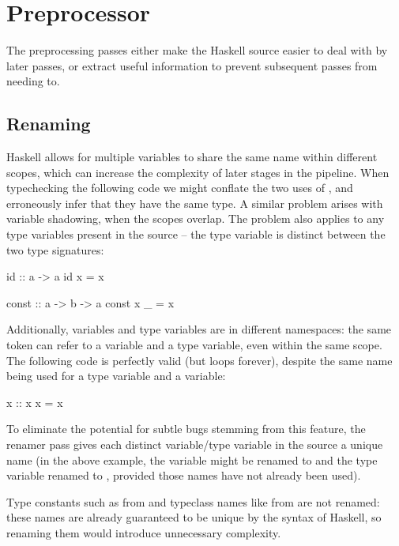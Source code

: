 \documentclass[dissertation.tex]{subfiles}
\begin{document}
\section{Preprocessor}
{
    The preprocessing passes either make the Haskell source easier to deal with by later passes, or extract useful information to prevent subsequent passes from needing to.

    \subsection{Renaming}
    {
        Haskell allows for multiple variables to share the same name within different scopes, which can increase the complexity of later stages in the pipeline. When typechecking the following code we might conflate the two uses of , and erroneously infer that they have the same type. A similar problem arises with variable shadowing, when the scopes overlap. The problem also applies to any type variables present in the source -- the type variable  is distinct between the two type signatures:

        \begin{haskellfigure}
        id :: a -> a
        id x = x

        const :: a -> b -> a
        const x _ = x
        \end{haskellfigure}

        Additionally, variables and type variables are in different namespaces: the same token can refer to a variable and a type variable, even within the same scope. The following code is perfectly valid (but loops forever), despite the same name being used for a type variable and a variable:

        \begin{haskellfigure}
        x :: x
        x = x
        \end{haskellfigure}

        To eliminate the potential for subtle bugs stemming from this feature, the renamer pass gives each distinct variable/type variable in the source a unique name (in the above example, the variable  might be renamed to  and the type variable renamed to , provided those names have not already been used).


        Type constants such as  from  and typeclass names like  from  are not renamed: these names are already guaranteed to be unique by the syntax of Haskell, so renaming them would introduce unnecessary complexity.
    }
}
\end{document}
